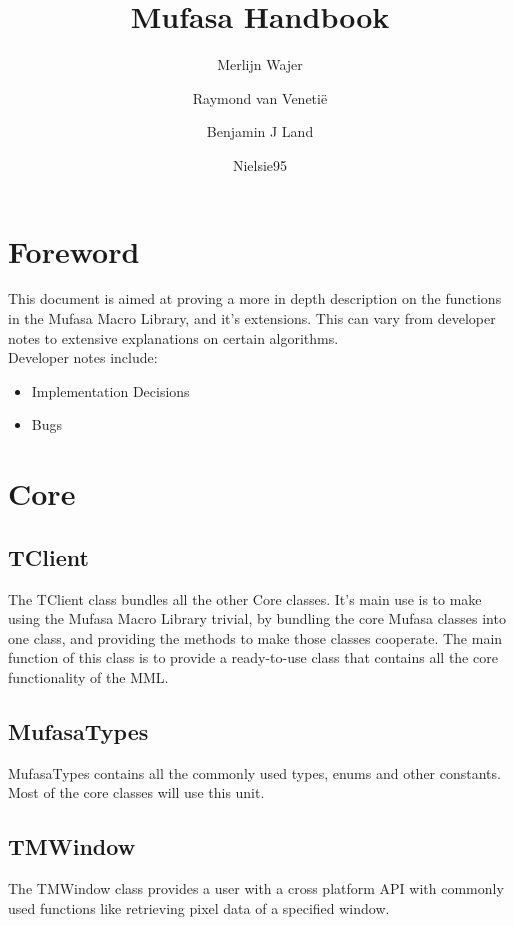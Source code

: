 \documentclass[a4paper]{report}
\begin{document}
\title{Mufasa Handbook}
\author{Merlijn Wajer \and Raymond van Veneti\"{e} \and Benjamin J Land 
\and Nielsie95}

\maketitle
\tableofcontents

\chapter{Foreword}

This document is aimed at proving a more in depth description on the
functions in the Mufasa Macro Library, and it's extensions.
This can vary from developer notes to extensive explanations on certain
algorithms. \\
Developer notes include:
\begin{itemize}
	\item Implementation Decisions
	\item Bugs
\end{itemize}

\chapter{Core}

\section{TClient}

The TClient class bundles all the other Core classes.
It's main use is to make using the Mufasa Macro Library trivial, by bundling
the core Mufasa classes into one class, and providing the methods to make those
classes cooperate. The main function of this class is to provide a
ready-to-use class that contains all the core functionality of the MML.

\section{MufasaTypes}

MufasaTypes contains all the commonly used types, enums and other constants.
Most of the core classes will use this unit.

\section{TMWindow}

The TMWindow class provides a user with a cross platform API with commonly used
functions like retrieving pixel data of a specified window.
\end{document}
